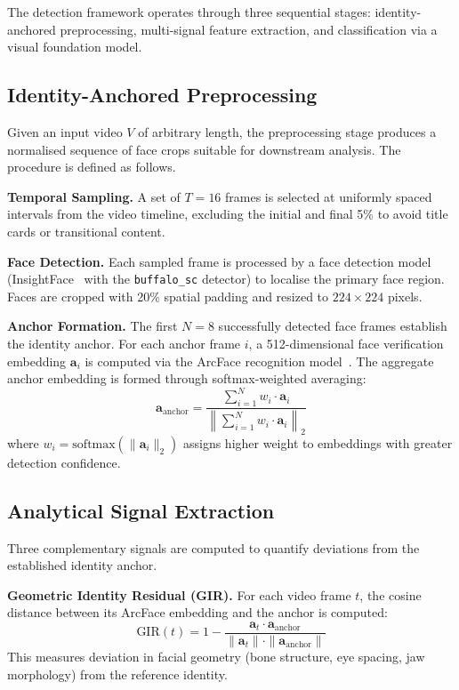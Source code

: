 \documentclass[11pt, twocolumn]{article}
\begin{document}
The detection framework operates through three sequential stages: identity-anchored preprocessing, multi-signal feature extraction, and classification via a visual foundation model.

\subsection{Identity-Anchored Preprocessing}

Given an input video $V$ of arbitrary length, the preprocessing stage produces a normalised sequence of face crops suitable for downstream analysis. The procedure is defined as follows.

\textbf{Temporal Sampling.} A set of $T=16$ frames is selected at uniformly spaced intervals from the video timeline, excluding the initial and final 5\% to avoid title cards or transitional content.

\textbf{Face Detection.} Each sampled frame is processed by a face detection model (InsightFace~\cite{deng2019arcface} with the \texttt{buffalo\_sc} detector) to localise the primary face region. Faces are cropped with 20\% spatial padding and resized to $224 \times 224$ pixels.

\textbf{Anchor Formation.} The first $N=8$ successfully detected face frames establish the identity anchor. For each anchor frame $i$, a 512-dimensional face verification embedding $\mathbf{a}_i$ is computed via the ArcFace recognition model~\cite{deng2019arcface}. The aggregate anchor embedding is formed through softmax-weighted averaging:
\begin{equation}
\mathbf{a}_{\text{anchor}} = \frac{\sum_{i=1}^{N} w_i \cdot \mathbf{a}_i}{\left\| \sum_{i=1}^{N} w_i \cdot \mathbf{a}_i \right\|_2}
\end{equation}
where $w_i = \text{softmax}(\|\mathbf{a}_i\|_2)$ assigns higher weight to embeddings with greater detection confidence.

\subsection{Analytical Signal Extraction}

Three complementary signals are computed to quantify deviations from the established identity anchor.

\textbf{Geometric Identity Residual (GIR).} For each video frame $t$, the cosine distance between its ArcFace embedding and the anchor is computed:
\begin{equation}
\text{GIR}(t) = 1 - \frac{\mathbf{a}_t \cdot \mathbf{a}_{\text{anchor}}}{\|\mathbf{a}_t\| \cdot \|\mathbf{a}_{\text{anchor}}\|}
\end{equation}
This measures deviation in facial geometry (bone structure, eye spacing, jaw morphology) from the reference identity.
\end{document}
